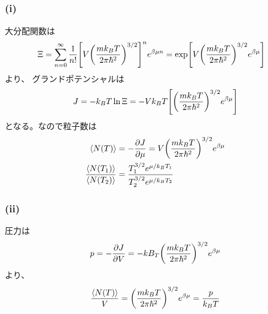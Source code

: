 \documentclass[../../sp_2017.tex]{subfiles}
\begin{document}
\subsection{}
\subsubsection{(i)}
大分配関数は
\begin{equation}\begin{aligned}[b]
    \Xi &= \sum_{n=0}^{\infty} \frac{1}{n!}\qty[V\qty(\frac{mk_BT}{2\pi\hbar^2})^{3/2}]^n e^{\beta \mu n}
    =\exp[V\qty(\frac{mk_BT}{2\pi\hbar^2})^{3/2}e^{\beta\mu}]
\end{aligned}\end{equation}
より、
グランドポテンシャルは
\begin{equation}\begin{aligned}[b]
    J = -k_BT\ln\Xi = -Vk_BT\qty[\qty(\frac{mk_BT}{2\pi\hbar^2})^{3/2}e^{\beta\mu}]
\end{aligned}\end{equation}
となる。なので粒子数は
\begin{equation}\begin{aligned}[b]
    \ev{N(T)}&=-\pdv{J}{\mu}=V\qty(\frac{mk_BT}{2\pi\hbar^2})^{3/2}e^{\beta\mu}\\
    \frac{\ev{N(T_1)}}{\ev{N(T_2)}} &= \frac{T_1^{3/2}e^{\mu/k_BT_1}}{T_2^{3/2}e^{\mu/k_BT_2}}
\end{aligned}\end{equation}

\subsubsection{(ii)}
圧力は
\begin{equation}\begin{aligned}[b]
    p = -\pdv{J}{V} = -kB_T\qty(\frac{mk_BT}{2\pi\hbar^2})^{3/2}e^{\beta\mu}
\end{aligned}\end{equation}
より、
\begin{equation}\begin{aligned}[b]
    \frac{\ev{N(T)}}{V}=\qty(\frac{mk_BT}{2\pi\hbar^2})^{3/2}e^{\beta\mu}=\frac{p}{k_BT}
\end{aligned}\end{equation}

\subsection{}
\end{document}
